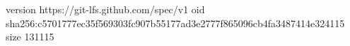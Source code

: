 version https://git-lfs.github.com/spec/v1
oid sha256:c5701777ec35f569303fc907b55177ad3e2777f865096cb4fa3487414e324115
size 131115
